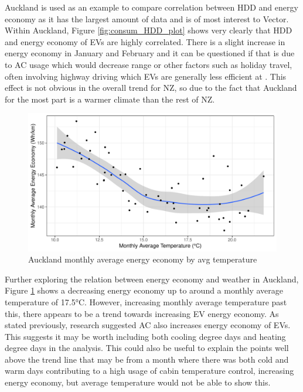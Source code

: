 \documentclass[
]{article}
\begin{document}
Auckland is used as an example to compare correlation between HDD and
energy economy as it has the largest amount of data and is of most
interest to Vector. Within Auckland, Figure \ref{fig:consum_HDD_plot}
shows very clearly that HDD and energy economy of EVs are highly
correlated. There is a slight increase in energy economy in January and
February and it can be questioned if that is due to AC usage which would
decrease range \cite{ev_range} or other factors such as holiday travel,
often involving highway driving which EVs are generally less efficient
at \cite{ev_highway}. This effect is not obvious in the overall trend
for NZ, so due to the fact that Auckland for the most part is a warmer
climate than the rest of NZ.

\begin{figure}
\centering
\includegraphics{final_report_files/figure-latex/temp_consum_plot-1.pdf}
\caption{Auckland monthly average energy economy by avg
temperature\label{fig:temp_consum_plot}}
\end{figure}

Further exploring the relation between energy economy and weather in
Auckland, Figure \ref{fig:temp_consum_plot} shows a decreasing energy
economy up to around a monthly average temperature of 17.5°C. However,
increasing monthly average temperature past this, there appears to be a
trend towards increasing EV energy economy. As stated previously,
research \cite{ev_range} suggested AC also increases energy economy of
EVs. This suggests it may be worth including both cooling degree days
and heating degree days in the analysis. This could also be useful to
explain the points well above the trend line that may be from a month
where there was both cold and warm days contributing to a high usage of
cabin temperature control, increasing energy economy, but average
temperature would not be able to show this.
\end{document}
